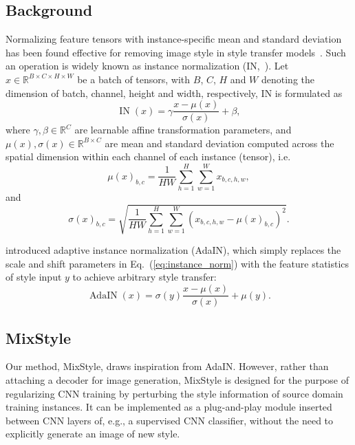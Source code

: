 \documentclass{article} \usepackage{iclr2021_conference,times}
\begin{document}
\subsection{Background} \label{sec:method:bg}
Normalizing feature tensors with instance-specific mean and standard deviation has been found effective for removing image style in style transfer models~\citep{ulyanov2016instance,huang2017arbitrary,dumoulin2017learned}. Such an operation is widely known as instance normalization (IN,~\citet{ulyanov2016instance}). Let $x \in \mathbb{R}^{B \times C \times H \times W}$ be a batch of tensors, with $B$, $C$, $H$ and $W$ denoting the dimension of batch, channel, height and width, respectively, IN is formulated as
\begin{equation} \label{eq:instance_norm}
\operatorname{IN}(x) = \gamma \frac{x - \mu(x)}{\sigma(x)} + \beta,
\end{equation}
where $\gamma, \beta \in \mathbb{R}^C$ are learnable affine transformation parameters, and $\mu(x), \sigma(x) \in \mathbb{R}^{B \times C}$ are mean and standard deviation computed across the spatial dimension within each channel of each instance (tensor), i.e.
\begin{equation}
\mu(x)_{b,c} = \frac{1}{HW} \sum_{h=1}^H \sum_{w=1}^W x_{b,c,h,w},
\end{equation}
and
\begin{equation}
\sigma(x)_{b,c} = \sqrt{ \frac{1}{HW} \sum_{h=1}^H \sum_{w=1}^W ( x_{b,c,h,w} - \mu(x)_{b,c} )^2 }.
\end{equation}

\citet{huang2017arbitrary} introduced adaptive instance normalization (AdaIN), which simply replaces the scale and shift parameters in Eq.~(\ref{eq:instance_norm}) with the feature statistics of style input $y$ to achieve arbitrary style transfer:
\begin{equation}
\operatorname{AdaIN}(x) = \sigma(y) \frac{x - \mu(x)}{\sigma(x)} + \mu(y).
\end{equation}


\subsection{MixStyle} \label{sec:method:mixstyle}
Our method, MixStyle, draws inspiration from AdaIN. However, rather than attaching a decoder for image generation, MixStyle is designed for the purpose of regularizing CNN training by perturbing the style information of source domain training instances. It can be implemented as a plug-and-play module inserted between CNN layers of, e.g., a supervised CNN classifier, without the need to explicitly generate an image of new style.
\end{document}
